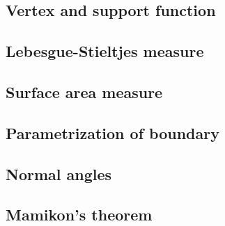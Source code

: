 
\subsection{Vertex and support function}
\label{sec:vertex-and-support-function}


\subsection{Lebesgue-Stieltjes measure}
\label{sec:lebesgue-stieltjes-measure}


\subsection{Surface area measure}
\label{sec:surface-area-measure}


\subsection{Parametrization of boundary}
\label{sec:parametrization-of-boundary}


\subsection{Normal angles}
\label{sec:normal-angles}


\subsection{Mamikon's theorem}
\label{sec:mamikon's-theorem}


